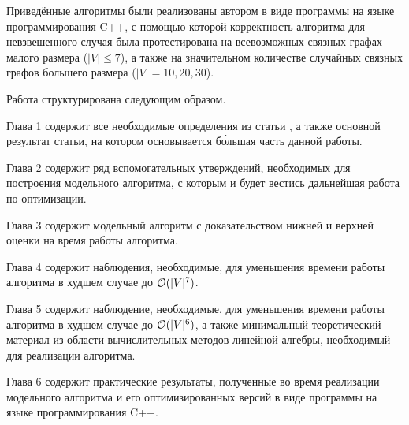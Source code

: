 Приведённые алгоритмы были реализованы автором в виде программы на языке программирования C++, с помощью которой корректность алгоритма для невзвешенного случая была протестирована на всевозможных связных графах малого размера ($|V| \leq 7$), а также на значительном количестве случайных связных графов большего размера ($|V| = 10, 20, 30$).

Работа структурирована следующим образом. 

Глава 1 содержит все необходимые определения из статьи \cite{ET}, а также основной результат статьи, на котором основывается б\'{о}льшая часть данной работы. 

Глава 2 содержит ряд вспомогательных утверждений, необходимых для построения модельного алгоритма, с которым и будет вестись дальнейшая работа по оптимизации.

Глава 3 содержит модельный алгоритм с доказательством нижней и верхней оценки на время работы алгоритма.

Глава 4 содержит наблюдения, необходимые, для уменьшения времени работы алгоритма в худшем случае до $\mathcal{O}(|V|^7)$.

Глава 5 содержит наблюдение, необходимые, для уменьшения времени работы алгоритма в худшем случае до $\mathcal{O}(|V|^6)$, а также минимальный теоретический материал из области вычислительных методов линейной алгебры, необходимый для реализации алгоритма.

Глава 6 содержит практические результаты, полученные во время реализации модельного алгоритма и его оптимизированных версий в виде программы на языке программирования C++.
